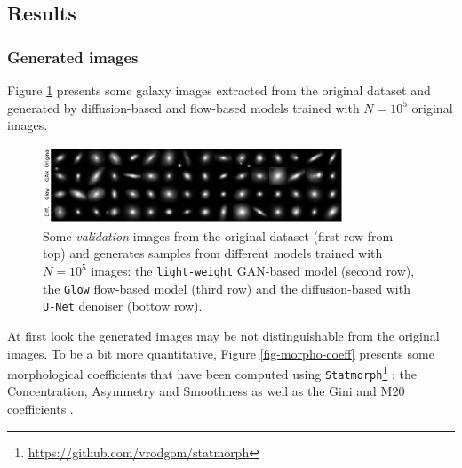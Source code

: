 \documentclass[11pt]{amsart}
\begin{document}
\subsection{Results}
%
\subsubsection{Generated images}
Figure \ref{fig-Original-Glow-UNet-Gan-samples} presents some galaxy images extracted from the original dataset and generated by  diffusion-based and flow-based models trained with $N=10^5$ original images. 
%
\begin{figure}
    \centering
        \includegraphics[width=0.8\textwidth]{fig-model_sample_images.pdf}
    \caption{Some \textit{validation} images from the original dataset (first row from top) and  generates samples from different models trained with $N=10^5$ images:  the \texttt{light-weight} GAN-based model (second row), the \texttt{Glow} flow-based model (third row) and the diffusion-based with \texttt{U-Net} denoiser (bottow row).}
    \label{fig-Original-Glow-UNet-Gan-samples}
\end{figure}
At first look the generated images may be not distinguishable from the original images.
To be a bit more quantitative, Figure \ref{fig-morpho-coeff} presents  some morphological coefficients that have been computed using \texttt{Statmorph}\footnote{\url{https://github.com/vrodgom/statmorph}} \citep{2019MNRAS.483.4140R}: the Concentration, Asymmetry and Smoothness \citep{2000AJ....119.2645B,2003ApJS..147....1C,2004AJ....128..163L}  as well as the Gini and M20 coefficients \citep{2004AJ....128..163L,10.1093/mnras/stv2078}.
\end{document}
